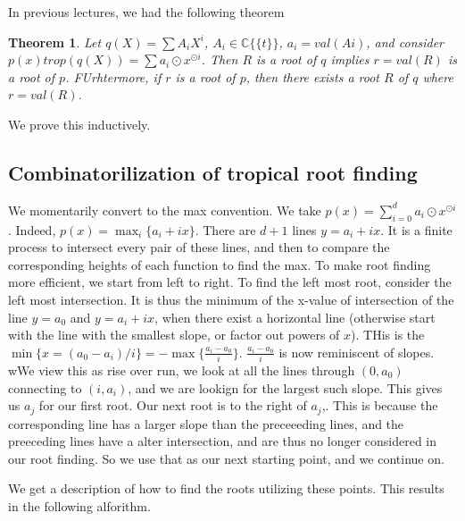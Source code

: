 \documentclass[11pt]{article}
\theoremstyle{definition}
\theoremstyle{plain}%
\newtheorem{prototheorem}{Theorem}[section]
\newenvironment{theorem}
   {\colorlet{shadecolor}{orange!15}\begin{shaded} \begin{prototheorem}}
   {\end{prototheorem}\end{shaded}}
\theoremstyle{definition}
\def\CC{{\mathbb C}}
\begin{document}
In previous lectures, we had the following theorem

\begin{theorem}
    Let $q(X) = \sum A_iX^i$, $A_i \in \CC \{\{t\}\}$, $a_i = val(Ai)$, and consider $p(x)  trop (q(X)) = \sum a_i \odot x^{\odot i}$. Then $R$ is a root of $q$ implies $r=val(R)$ is a root of $p$. FUrhtermore, if $r$ is a root of $p$, then there exists a root $R$ of $q$ where $r = val(R)$.
\end{theorem}
We prove this inductively. 


\subsection{Combinatorilization of tropical root finding}

We momentarily convert to the max convention. We take $p(x) = \sum\limits_{i=0}^d a_i \odot x^{\odot i}$. Indeed, $p(x) = \max_i \{a_i + ix\}$. There are $d+1$ lines $y= a_i + ix$. It is a finite process to intersect every pair of these lines, and then to compare the corresponding heights of each function to find the max. To make root finding more efficient, we start from left to right. To find the left most root, consider the left most intersection. It is thus the minimum of the x-value of intersection of the line $y=a_0$ and $y=a_i + ix$, when there exist a horizontal line (otherwise start with the line with the smallest slope, or factor out powers of $x$). THis is the $\min\{ x= (a_0-a_i)/i\}=-\max \{\frac{a_i-a_0}{i}\}$. $\frac{a_i-a_0}{i}$ is now reminiscent of slopes. wWe view this as rise over run, we look at all the lines through $(0,a_0)$ connecting to $(i,a_i)$, and we are lookign for the largest such slope. This gives us $a_j$ for our first root. Our next root is to the right of $a_j$,. This is because the corresponding line has a larger slope than the preceeeding lines, and the preeceding lines have a alter intersection, and are thus no longer considered in our root finding. So we use that as our next starting point, and we continue on.

We get a description of how to find the roots utilizing these points. This results in the following alforithm.
\end{document}
